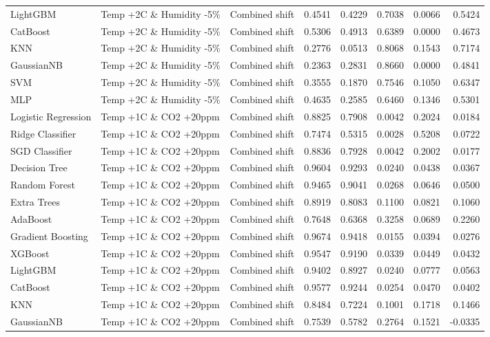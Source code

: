 \begin{tabular}{lllrrrrr}
LightGBM & Temp +2C \& Humidity -5\% & Combined shift & 0.4541 & 0.4229 & 0.7038 & 0.0066 & 0.5424 \\
CatBoost & Temp +2C \& Humidity -5\% & Combined shift & 0.5306 & 0.4913 & 0.6389 & 0.0000 & 0.4673 \\
KNN & Temp +2C \& Humidity -5\% & Combined shift & 0.2776 & 0.0513 & 0.8068 & 0.1543 & 0.7174 \\
GaussianNB & Temp +2C \& Humidity -5\% & Combined shift & 0.2363 & 0.2831 & 0.8660 & 0.0000 & 0.4841 \\
SVM & Temp +2C \& Humidity -5\% & Combined shift & 0.3555 & 0.1870 & 0.7546 & 0.1050 & 0.6347 \\
MLP & Temp +2C \& Humidity -5\% & Combined shift & 0.4635 & 0.2585 & 0.6460 & 0.1346 & 0.5301 \\
Logistic Regression & Temp +1C \& CO2 +20ppm & Combined shift & 0.8825 & 0.7908 & 0.0042 & 0.2024 & 0.0184 \\
Ridge Classifier & Temp +1C \& CO2 +20ppm & Combined shift & 0.7474 & 0.5315 & 0.0028 & 0.5208 & 0.0722 \\
SGD Classifier & Temp +1C \& CO2 +20ppm & Combined shift & 0.8836 & 0.7928 & 0.0042 & 0.2002 & 0.0177 \\
Decision Tree & Temp +1C \& CO2 +20ppm & Combined shift & 0.9604 & 0.9293 & 0.0240 & 0.0438 & 0.0367 \\
Random Forest & Temp +1C \& CO2 +20ppm & Combined shift & 0.9465 & 0.9041 & 0.0268 & 0.0646 & 0.0500 \\
Extra Trees & Temp +1C \& CO2 +20ppm & Combined shift & 0.8919 & 0.8083 & 0.1100 & 0.0821 & 0.1060 \\
AdaBoost & Temp +1C \& CO2 +20ppm & Combined shift & 0.7648 & 0.6368 & 0.3258 & 0.0689 & 0.2260 \\
Gradient Boosting & Temp +1C \& CO2 +20ppm & Combined shift & 0.9674 & 0.9418 & 0.0155 & 0.0394 & 0.0276 \\
XGBoost & Temp +1C \& CO2 +20ppm & Combined shift & 0.9547 & 0.9190 & 0.0339 & 0.0449 & 0.0432 \\
LightGBM & Temp +1C \& CO2 +20ppm & Combined shift & 0.9402 & 0.8927 & 0.0240 & 0.0777 & 0.0563 \\
CatBoost & Temp +1C \& CO2 +20ppm & Combined shift & 0.9577 & 0.9244 & 0.0254 & 0.0470 & 0.0402 \\
KNN & Temp +1C \& CO2 +20ppm & Combined shift & 0.8484 & 0.7224 & 0.1001 & 0.1718 & 0.1466 \\
GaussianNB & Temp +1C \& CO2 +20ppm & Combined shift & 0.7539 & 0.5782 & 0.2764 & 0.1521 & -0.0335 \\

\end{tabular}
